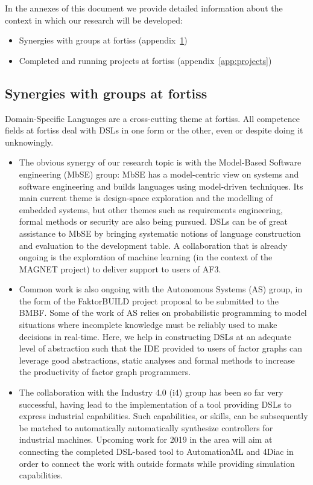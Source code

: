 \documentclass{scrartcl}
\begin{document}
In the annexes of this document we provide detailed information about the
context in which our research will be developed:

\begin{itemize}
  \item Synergies with groups at fortiss (appendix~\ref{app:synergies})
  \item Completed and running projects at fortiss (appendix~\ref{app:projects})
\end{itemize}

\pagebreak
 
\begin{appendices}

\section{Synergies with groups at fortiss}
\label{app:synergies}

Domain-Specific Languages are a cross-cutting theme at fortiss. All
competence fields at fortiss deal with DSLs in one form or the
other, even or despite doing it unknowingly.

\begin{itemize}
\item The obvious synergy of our research topic is with the Model-Based
Software engineering (MbSE) group:
MbSE has a model-centric view on systems and software engineering and builds languages using model-driven
techniques. Its main current theme is design-space exploration and the modelling
of  embedded systems, but other themes such as requirements engineering, formal
methods or security are also being pursued. DSLs can be of great assistance to
MbSE by bringing systematic notions of language construction and evaluation to
the development table. A collaboration that is already ongoing is the
exploration of machine learning (in the context of the MAGNET project) to deliver support to users of AF3.
\item Common work is also ongoing with the Autonomous Systems (AS) group, in the
form of the FaktorBUILD project proposal to be submitted to the BMBF. Some of
the work of AS relies on probabilistic programming to model situations where incomplete knowledge must be reliably used
to make decisions in real-time. Here, we help in constructing DSLs at an
adequate level of abstraction such that the IDE provided to users of factor
graphs can leverage good abstractions, static analyses and formal methods to
increase the productivity of factor graph programmers.
\item The collaboration with the Industry 4.0 (i4) group has been so far very
successful, having lead to the implementation of a tool
providing DSLs to express industrial capabilities. Such capabilities, or
skills, can be subsequently be matched to automatically automatically synthesize
controllers for industrial machines. Upcoming work for 2019 in the area will aim
at connecting the completed DSL-based tool to AutomationML and 4Diac in order
to connect the work with outside formats while providing simulation capabilities. 
\end{itemize}


\end{appendices}
\end{document}
